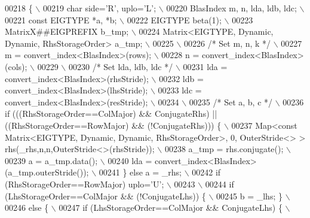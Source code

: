 \begin{DoxyCode}
00218 \textcolor{preprocessor}{  \{ \(\backslash\)}
00219 \textcolor{preprocessor}{    char side='R', uplo='L'; \(\backslash\)}
00220 \textcolor{preprocessor}{    BlasIndex m, n, lda, ldb, ldc; \(\backslash\)}
00221 \textcolor{preprocessor}{    const EIGTYPE *a, *b; \(\backslash\)}
00222 \textcolor{preprocessor}{    EIGTYPE beta(1); \(\backslash\)}
00223 \textcolor{preprocessor}{    MatrixX##EIGPREFIX b\_tmp; \(\backslash\)}
00224 \textcolor{preprocessor}{    Matrix<EIGTYPE, Dynamic, Dynamic, RhsStorageOrder> a\_tmp; \(\backslash\)}
00225 \textcolor{preprocessor}{\(\backslash\)}
00226 \textcolor{preprocessor}{}\textcolor{comment}{/* Set m, n, k */}\textcolor{preprocessor}{ \(\backslash\)}
00227 \textcolor{preprocessor}{    m = convert\_index<BlasIndex>(rows); \(\backslash\)}
00228 \textcolor{preprocessor}{    n = convert\_index<BlasIndex>(cols); \(\backslash\)}
00229 \textcolor{preprocessor}{\(\backslash\)}
00230 \textcolor{preprocessor}{}\textcolor{comment}{/* Set lda, ldb, ldc */}\textcolor{preprocessor}{ \(\backslash\)}
00231 \textcolor{preprocessor}{    lda = convert\_index<BlasIndex>(rhsStride); \(\backslash\)}
00232 \textcolor{preprocessor}{    ldb = convert\_index<BlasIndex>(lhsStride); \(\backslash\)}
00233 \textcolor{preprocessor}{    ldc = convert\_index<BlasIndex>(resStride); \(\backslash\)}
00234 \textcolor{preprocessor}{\(\backslash\)}
00235 \textcolor{preprocessor}{}\textcolor{comment}{/* Set a, b, c */}\textcolor{preprocessor}{ \(\backslash\)}
00236 \textcolor{preprocessor}{    if (((RhsStorageOrder==ColMajor) && ConjugateRhs) || ((RhsStorageOrder==RowMajor) && (!ConjugateRhs)))
       \{ \(\backslash\)}
00237 \textcolor{preprocessor}{      Map<const Matrix<EIGTYPE, Dynamic, Dynamic, RhsStorageOrder>, 0, OuterStride<> >
       rhs(\_rhs,n,n,OuterStride<>(rhsStride)); \(\backslash\)}
00238 \textcolor{preprocessor}{      a\_tmp = rhs.conjugate(); \(\backslash\)}
00239 \textcolor{preprocessor}{      a = a\_tmp.data(); \(\backslash\)}
00240 \textcolor{preprocessor}{      lda = convert\_index<BlasIndex>(a\_tmp.outerStride()); \(\backslash\)}
00241 \textcolor{preprocessor}{    \} else a = \_rhs; \(\backslash\)}
00242 \textcolor{preprocessor}{    if (RhsStorageOrder==RowMajor) uplo='U'; \(\backslash\)}
00243 \textcolor{preprocessor}{\(\backslash\)}
00244 \textcolor{preprocessor}{    if (LhsStorageOrder==ColMajor && (!ConjugateLhs)) \{ \(\backslash\)}
00245 \textcolor{preprocessor}{       b = \_lhs; \} \(\backslash\)}
00246 \textcolor{preprocessor}{    else \{ \(\backslash\)}
00247 \textcolor{preprocessor}{      if (LhsStorageOrder==ColMajor && ConjugateLhs) \{ \(\backslash\)}

\end{DoxyCode}
